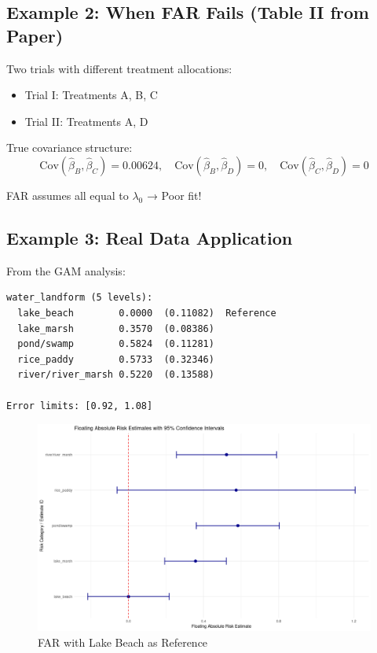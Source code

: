 \documentclass[11pt]{article}
\begin{document}
\subsection{Example 2: When FAR Fails (Table II from Paper)}

Two trials with different treatment allocations:
\begin{itemize}
    \item Trial I: Treatments A, B, C
    \item Trial II: Treatments A, D
\end{itemize}

True covariance structure:
\begin{equation}
    \text{Cov}(\hat{\beta}_B, \hat{\beta}_C) = 0.00624, \quad
    \text{Cov}(\hat{\beta}_B, \hat{\beta}_D) = 0, \quad
    \text{Cov}(\hat{\beta}_C, \hat{\beta}_D) = 0
\end{equation}

FAR assumes all equal to $\lambda_0$ → Poor fit!

\subsection{Example 3: Real Data Application}

From the GAM analysis:
\begin{verbatim}
water_landform (5 levels):
  lake_beach        0.0000  (0.11082)  Reference
  lake_marsh        0.3570  (0.08386)  
  pond/swamp        0.5824  (0.11281)  
  rice_paddy        0.5733  (0.32346)  
  river/river_marsh 0.5220  (0.13588)  
  
Error limits: [0.92, 1.08]
\end{verbatim}

\begin{figure}
    \centering
    \includegraphics[width=0.9\linewidth]{overviews//FAR-clustere-SE//figs/lake_beach_ref.png}
    \caption{FAR with Lake Beach as Reference}
    \label{fig:lakembeach_ref}
\end{figure}
\end{document}
